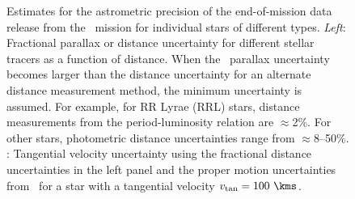 \begin{figure}[h]
\centering
\caption{Estimates for the astrometric precision of the end-of-mission data
release from the \gaia\ mission for individual stars of different types.
\textit{Left}: Fractional parallax or distance uncertainty for different stellar
tracers as a function of distance. When the \gaia\ parallax uncertainty becomes
larger than the distance uncertainty for an alternate distance measurement
method, the minimum uncertainty is assumed. For example, for RR Lyrae (RRL)
stars, distance measurements from the period-luminosity relation are
$\approx$2\%. For other stars, photometric distance uncertainties range from
$\approx$8--50\%. : Tangential velocity uncertainty using the
fractional distance uncertainties in the left panel and the proper motion
uncertainties from \gaia\ for a star with a tangential velocity $v_{\rm tan} =
100~\kms$.}
\label{fig:gaia-tracer-errs}
\end{figure}